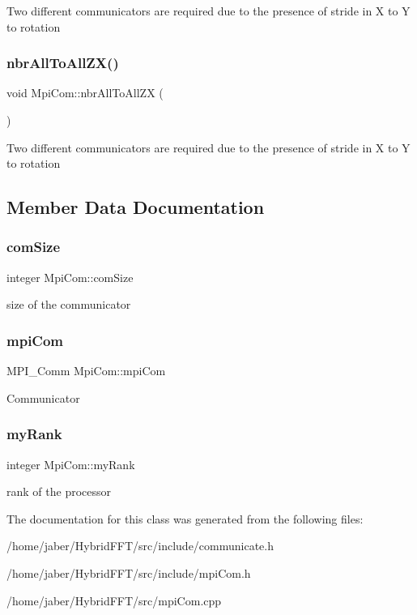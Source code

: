 Two different communicators are required due to the presence of stride in X to Y to rotation \mbox{\label{structMpiCom_a8e3a47d8f20b9ac6960cddf641050d44}} 
\subsubsection{\texorpdfstring{nbr\+All\+To\+All\+Z\+X()}{nbrAllToAllZX()}}
{\footnotesize\ttfamily void Mpi\+Com\+::nbr\+All\+To\+All\+ZX (\begin{DoxyParamCaption}{ }\end{DoxyParamCaption})}

Two different communicators are required due to the presence of stride in X to Y to rotation 

\subsection{Member Data Documentation}
\mbox{\label{structMpiCom_a4eed91926f470dfd8f21e1ad8c6fdcec}} 
\subsubsection{\texorpdfstring{com\+Size}{comSize}}
{\footnotesize\ttfamily integer Mpi\+Com\+::com\+Size}

size of the communicator \mbox{\label{structMpiCom_a9ebe073c2a5d866e2eeeffeddc5d6ed9}} 
\subsubsection{\texorpdfstring{mpi\+Com}{mpiCom}}
{\footnotesize\ttfamily M\+P\+I\+\_\+\+Comm Mpi\+Com\+::mpi\+Com}

Communicator \mbox{\label{structMpiCom_a822a5db15cf1bf27f846cec23de7c785}} 
\subsubsection{\texorpdfstring{my\+Rank}{myRank}}
{\footnotesize\ttfamily integer Mpi\+Com\+::my\+Rank}

rank of the processor 

The documentation for this class was generated from the following files\+:\begin{DoxyCompactItemize}
\item 
/home/jaber/\+Hybrid\+F\+F\+T/src/include/communicate.\+h\item 
/home/jaber/\+Hybrid\+F\+F\+T/src/include/mpi\+Com.\+h\item 
/home/jaber/\+Hybrid\+F\+F\+T/src/mpi\+Com.\+cpp\end{DoxyCompactItemize}
